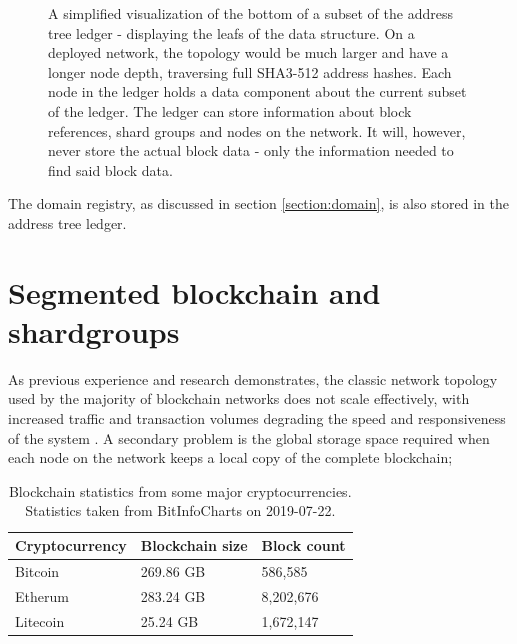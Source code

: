 \documentclass[10pt,a4paper,final]{article}
\begin{document}
\begin{figure}[H]
\centering
{}
\caption{A simplified visualization of the bottom of a subset of the address tree ledger - displaying the leafs of the data structure. On a deployed network, the topology would be much larger and have a longer node depth, traversing full SHA3-512 address hashes. Each node in the ledger holds a data component about the current subset of the ledger. The ledger can store information about block references, shard groups and nodes on the network. It will, however, never store the actual block data - only the information needed to find said block data.}
\end{figure}

\noindent The domain registry, as discussed in section \ref{section:domain}, is also stored in the address tree ledger. 

\section{Segmented blockchain and \glspl{shardgroup}}
As previous experience and research demonstrates, the classic network topology used by the majority of blockchain networks does not scale effectively, with increased traffic and transaction volumes degrading the speed and responsiveness of the system \cite{songze2018}. A secondary problem is the global storage space required when each node on the network keeps a local copy of the complete blockchain;

\begin{table}[H]
\centering
\begin{tabular}{|p{3cm}|p{3cm}|p{2.5cm}|}
	\hline
	Cryptocurrency & Blockchain size & Block count \\
	\hline
	Bitcoin & 269.86 GB & 586,585\\
	Etherum & 283.24 GB & 	8,202,676\\
	Litecoin & 25.24 GB & 1,672,147\\
	\hline
\end{tabular}
\caption{Blockchain statistics from some major cryptocurrencies. Statistics taken from BitInfoCharts \cite{bitinfocharts2019} on 2019-07-22.}
\end{table}
\end{document}
